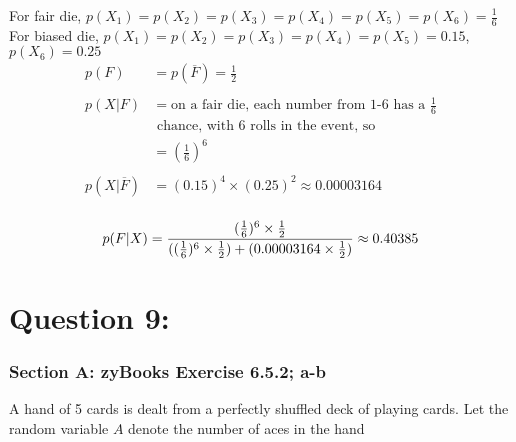 \documentclass[14pt]{extreport}
\begin{document}
\begin{enumerate}[label=(\alph*)]
\begin{enumerate}
                    For fair die, $p(X_{1}) = p(X_{2}) = p(X_{3}) = p(X_{4}) = p(X_{5}) = p(X_{6}) = \frac{1}{6}$\\
                    For biased die, $p(X_{1}) = p(X_{2}) = p(X_{3}) = p(X_{4}) = p(X_{5}) = 0.15$,\\
                    $p(X_{6}) = 0.25$\\
                    
                    \begin{align*}
                        p(F)    &= p(\overline{F}) = \frac{1}{2}\\
                                \\
                        p(X|F)  &= \text{on a fair die, each number from 1-6 has a }\frac{1}{6}\\
                                &  \text{ chance, with 6 rolls in the event, so} \\
                                &= (\frac{1}{6})^{6}\\
                                \\
                        p(X|\overline{F}) &= (0.15)^{4} \times (0.25)^{2} \approx 0.00003164\\    
                    \end{align*}
                    
                    \begin{equation*}
                    p(F|X)=\frac{(\frac{1}{6})^{6} \times \frac{1}{2}}{((\frac{1}{6})^{6} \times \frac{1}{2}) + (0.00003164 \times \frac{1}{2})}
                    \approx 0.40385\\
                    \end{equation*}
                    
        \end{enumerate}

\end{enumerate}
\newpage    

\section*{Question 9:}

\subsubsection*{Section A: zyBooks Exercise 6.5.2; a-b}

A hand of 5 cards is dealt from a perfectly shuffled deck of playing cards. Let the random variable \( A \) denote the number of aces in the hand
\end{document}
